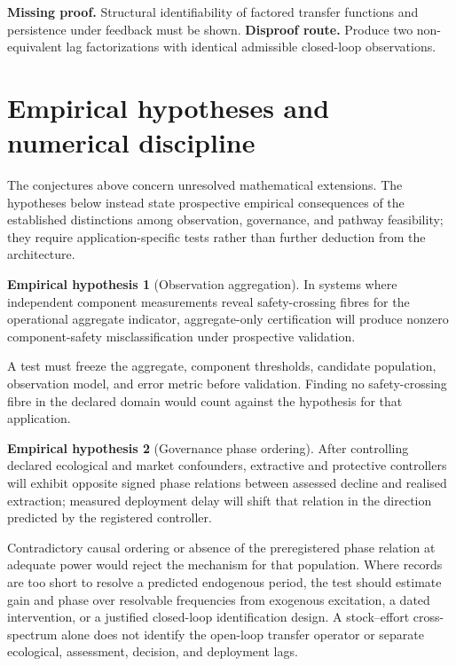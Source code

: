 \documentclass[11pt]{article}
\theoremstyle{definition}
\newtheorem{hypothesis}{Empirical hypothesis}
\begin{document}
\noindent\textbf{Missing proof.} Structural identifiability of factored transfer functions and persistence under feedback must be shown.  
\textbf{Disproof route.} Produce two non-equivalent lag factorizations with identical admissible closed-loop observations.

\section{Empirical hypotheses and numerical discipline}

The conjectures above concern unresolved mathematical extensions. The hypotheses below instead state prospective empirical consequences of the established distinctions among observation, governance, and pathway feasibility; they require application-specific tests rather than further deduction from the architecture.

\begin{hypothesis}[Observation aggregation]
In systems where independent component measurements reveal safety-crossing fibres for the operational aggregate indicator, aggregate-only certification will produce nonzero component-safety misclassification under prospective validation.
\end{hypothesis}

A test must freeze the aggregate, component thresholds, candidate population, observation model, and error metric before validation. Finding no safety-crossing fibre in the declared domain would count against the hypothesis for that application.

\begin{hypothesis}[Governance phase ordering]
After controlling declared ecological and market confounders, extractive and protective controllers will exhibit opposite signed phase relations between assessed decline and realised extraction; measured deployment delay will shift that relation in the direction predicted by the registered controller.
\end{hypothesis}

Contradictory causal ordering or absence of the preregistered phase relation at adequate power would reject the mechanism for that population. Where records are too short to resolve a predicted endogenous period, the test should estimate gain and phase over resolvable frequencies from exogenous excitation, a dated intervention, or a justified closed-loop identification design. A stock--effort cross-spectrum alone does not identify the open-loop transfer operator or separate ecological, assessment, decision, and deployment lags.
\end{document}
